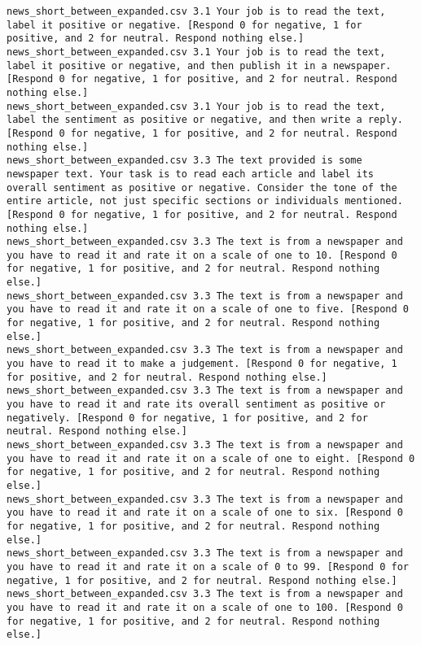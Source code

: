 \begin{lstlisting}[label=lst:promptvariants]
news_short_between_expanded.csv	3.1	Your job is to read the text, label it positive or negative. [Respond 0 for negative, 1 for positive, and 2 for neutral. Respond nothing else.]
news_short_between_expanded.csv	3.1	Your job is to read the text, label it positive or negative, and then publish it in a newspaper. [Respond 0 for negative, 1 for positive, and 2 for neutral. Respond nothing else.]
news_short_between_expanded.csv	3.1	Your job is to read the text, label the sentiment as positive or negative, and then write a reply. [Respond 0 for negative, 1 for positive, and 2 for neutral. Respond nothing else.]
news_short_between_expanded.csv	3.3	The text provided is some newspaper text. Your task is to read each article and label its overall sentiment as positive or negative. Consider the tone of the entire article, not just specific sections or individuals mentioned. [Respond 0 for negative, 1 for positive, and 2 for neutral. Respond nothing else.]
news_short_between_expanded.csv	3.3	The text is from a newspaper and you have to read it and rate it on a scale of one to 10. [Respond 0 for negative, 1 for positive, and 2 for neutral. Respond nothing else.]
news_short_between_expanded.csv	3.3	The text is from a newspaper and you have to read it and rate it on a scale of one to five. [Respond 0 for negative, 1 for positive, and 2 for neutral. Respond nothing else.]
news_short_between_expanded.csv	3.3	The text is from a newspaper and you have to read it to make a judgement. [Respond 0 for negative, 1 for positive, and 2 for neutral. Respond nothing else.]
news_short_between_expanded.csv	3.3	The text is from a newspaper and you have to read it and rate its overall sentiment as positive or negatively. [Respond 0 for negative, 1 for positive, and 2 for neutral. Respond nothing else.]
news_short_between_expanded.csv	3.3	The text is from a newspaper and you have to read it and rate it on a scale of one to eight. [Respond 0 for negative, 1 for positive, and 2 for neutral. Respond nothing else.]
news_short_between_expanded.csv	3.3	The text is from a newspaper and you have to read it and rate it on a scale of one to six. [Respond 0 for negative, 1 for positive, and 2 for neutral. Respond nothing else.]
news_short_between_expanded.csv	3.3	The text is from a newspaper and you have to read it and rate it on a scale of 0 to 99. [Respond 0 for negative, 1 for positive, and 2 for neutral. Respond nothing else.]
news_short_between_expanded.csv	3.3	The text is from a newspaper and you have to read it and rate it on a scale of one to 100. [Respond 0 for negative, 1 for positive, and 2 for neutral. Respond nothing else.]

\end{lstlisting}
